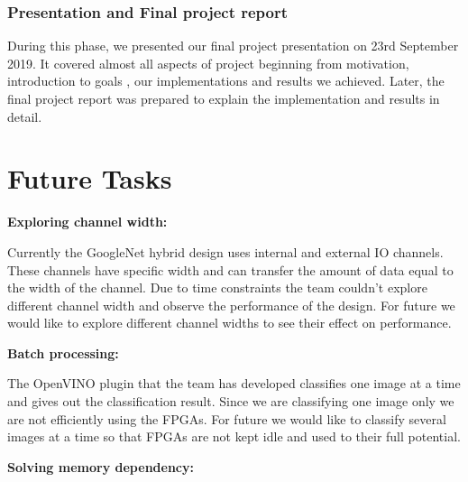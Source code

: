 \subsection{Presentation and Final project report}
During this phase, we presented our final project presentation on 23rd September 2019. It covered almost all aspects of project beginning from motivation, introduction to goals , our implementations and results we achieved. Later, the final project report was prepared to explain the implementation and results in detail. 

\chapter{Future Tasks} \label{chp:FutureTasks}
          \item \textbf{ Exploring channel width:} \medskip
    
    Currently the GoogleNet hybrid design uses internal and external IO channels. These channels have specific width and can transfer the amount of data equal to the width of the channel. Due to time constraints the team couldn’t explore different channel width and observe the performance of the design. For future we would like to explore different channel widths to see their effect on performance.
    
     \item \textbf{Batch processing: }\medskip
    
    The OpenVINO plugin that the team has developed classifies one image at a time and gives out the classification result. Since we are classifying one image only we are not efficiently using the FPGAs. For future we would like to classify several images at a time so that FPGAs are not kept idle and used to their full potential.

 \item  \textbf{Solving memory dependency: }   
 
